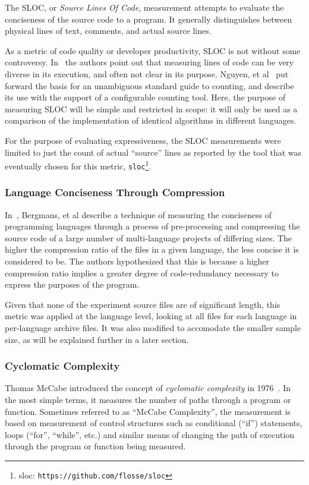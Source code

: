 The SLOC, or \textit{Source Lines Of Code}, measurement attempts to evaluate the conciseness of the source code to a program. It generally distinguishes between physical lines of text, comments, and actual source lines.

As a metric of code quality or developer productivity, SLOC is not without some controversy. In~\cite{alpernas} the authors point out that measuring lines of code can be very diverse in its execution, and often not clear in its purpose. Nguyen, et al~\cite{nguyen} put forward the basis for an unambiguous standard guide to counting, and describe its use with the support of a configurable counting tool. Here, the purpose of measuring SLOC will be simple and restricted in scope: it will only be used as a comparison of the implementation of identical algorithms in different languages.

For the purpose of evaluating expressiveness, the SLOC measurements were limited to just the count of actual ``source'' lines as reported by the tool that was eventually chosen for this metric, \texttt{sloc}\footnote{sloc: \texttt{https://github.com/flosse/sloc}}.

\subsubsection{Language Conciseness Through Compression}

In~\cite{bergmans}, Bergmans, et al describe a technique of measuring the conciseness of programming languages through a process of pre-processing and compressing the source code of a large number of multi-language projects of differing sizes. The higher the compression ratio of the files in a given language, the less concise it is considered to be. The authors hypothesized that this is because a higher compression ratio implies a greater degree of code-redundancy necessary to express the purposes of the program.

Given that none of the experiment source files are of significant length, this metric was applied at the language level, looking at all files for each language in per-language archive files. It was also modified to accomodate the smaller sample size, as will be explained further in a later section.

\subsubsection{Cyclomatic Complexity}

Thomas McCabe introduced the concept of \textit{cyclomatic complexity} in 1976~\cite{mccabe}. In the most simple terms, it measures the number of paths through a program or function. Sometimes referred to as ``McCabe Complexity'', the measurement is based on measurement of control structures such as conditional (``if'') statements, loops (``for'', ``while'', etc.) and similar means of changing the path of execution through the program or function being measured.

